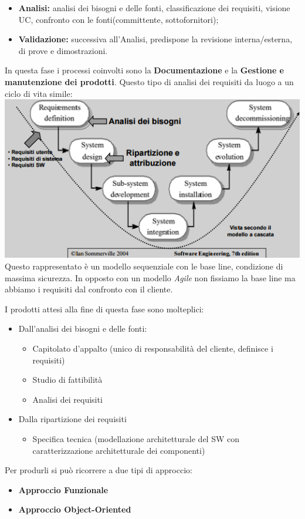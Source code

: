 \begin{itemize}

	\item \textbf{Analisi:} analisi dei bisogni e delle fonti, classificazione dei requisiti, visione UC, confronto con le fonti(committente, sottofornitori);
	\item \textbf{Validazione:} successiva all'Analisi, predispone la revisione interna/esterna, di prove e dimostrazioni.

\end{itemize}

In questa fase i processi coinvolti sono la \textbf{Documentazione} e la \textbf{Gestione e manutenzione dei prodotti}. Questo tipo di analisi dei requisiti da luogo a un ciclo di vita simile:\\
\includegraphics[width=0.75\columnwidth]{img1}
\\
Questo rappresentato è un modello sequenziale con le base line, condizione di massima sicurezza. In opposto con un modello \textit{Agile} non fissiamo la base line ma abbiamo i requisiti dal confronto con il cliente.

I prodotti attesi alla fine di questa fase sono molteplici:

\begin{itemize}
	\item Dall'analisi dei bisogni e delle fonti:
	\begin{itemize}
		\item Capitolato d'appalto (unico di responsabilità del cliente, definisce i requisiti)
		\item Studio di fattibilità
		\item Analisi dei requisiti
	\end{itemize}
	\item Dalla ripartizione dei requisiti
	\begin{itemize}
		\item Specifica tecnica (modellazione architetturale del SW con caratterizzazione architetturale dei componenti)
	\end{itemize}
\end{itemize}

Per produrli si può  ricorrere a due tipi di approccio:
\begin{itemize}
	\item \textbf{Approccio Funzionale}
	\item \textbf{Approccio Object-Oriented}
\end{itemize}
